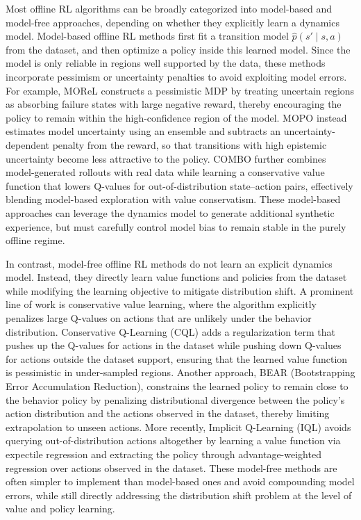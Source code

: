 \documentclass[master,english,final]{kaist-ucs}
\begin{document}
Most offline RL algorithms can be broadly categorized into model-based and model-free approaches, depending on whether they explicitly learn a dynamics model. Model-based offline RL methods first fit a transition model $\hat{p}(s' \mid s,a)$ from the dataset, and then optimize a policy inside this learned model. Since the model is only reliable in regions well supported by the data, these methods incorporate pessimism or uncertainty penalties to avoid exploiting model errors. For example, MOReL\cite{kidambi2020morel} constructs a pessimistic MDP by treating uncertain regions as absorbing failure states with large negative reward, thereby encouraging the policy to remain within the high-confidence region of the model. MOPO\cite{yu2020mopo} instead estimates model uncertainty using an ensemble and subtracts an uncertainty-dependent penalty from the reward, so that transitions with high epistemic uncertainty become less attractive to the policy. COMBO\cite{yu2021combo} further combines model-generated rollouts with real data while learning a conservative value function that lowers Q-values for out-of-distribution state–action pairs, effectively blending model-based exploration with value conservatism. These model-based approaches can leverage the dynamics model to generate additional synthetic experience, but must carefully control model bias to remain stable in the purely offline regime.

In contrast, model-free offline RL methods do not learn an explicit dynamics model. Instead, they directly learn value functions and policies from the dataset while modifying the learning objective to mitigate distribution shift. A prominent line of work is conservative value learning, where the algorithm explicitly penalizes large Q-values on actions that are unlikely under the behavior distribution. Conservative Q-Learning (CQL)\cite{kumar2020conservative} adds a regularization term that pushes up the Q-values for actions in the dataset while pushing down Q-values for actions outside the dataset support, ensuring that the learned value function is pessimistic in under-sampled regions. Another approach, BEAR (Bootstrapping Error Accumulation Reduction)\cite{kumar2019stabilizing}, constrains the learned policy to remain close to the behavior policy by penalizing distributional divergence between the policy’s action distribution and the actions observed in the dataset, thereby limiting extrapolation to unseen actions. More recently, Implicit Q-Learning (IQL)\cite{kostrikov2021offline} avoids querying out-of-distribution actions altogether by learning a value function via expectile regression and extracting the policy through advantage-weighted regression over actions observed in the dataset. These model-free methods are often simpler to implement than model-based ones and avoid compounding model errors, while still directly addressing the distribution shift problem at the level of value and policy learning.
\end{document}
